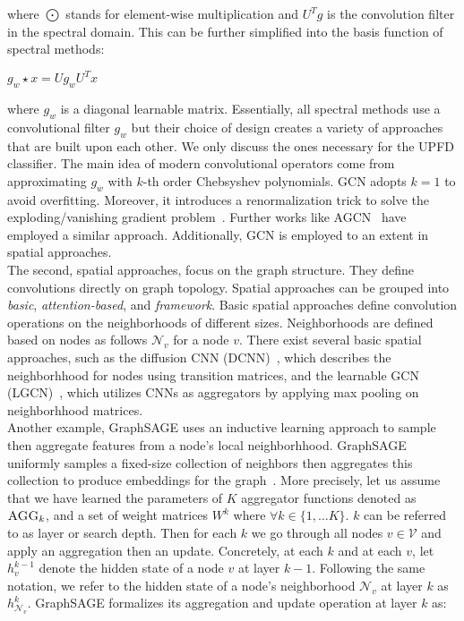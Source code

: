 where $\bigodot$ stands for element-wise multiplication and $U^Tg$ is the convolution filter in the spectral domain. This can be further simplified into the basis function of spectral methods:
\begin{center}
    $g_w \star x = U g_w U^T x$
\end{center}
where $g_w$ is a diagonal learnable matrix. Essentially, all spectral methods use a convolutional filter $g_w$ but their choice of design creates a variety of approaches that are built upon each other. We only discuss the ones necessary for the UPFD classifier. The main idea of modern convolutional operators come from approximating $g_w$ with $k$-th order Chebsyshev polynomials. GCN adopts $k=1$ to avoid overfitting. Moreover, it introduces a renormalization trick to solve the exploding/vanishing gradient problem~\parencite{GCN_Kipf}. Further works like AGCN~\parencite{AGCN_Li} have employed a similar approach. Additionally, GCN is employed to an extent in spatial approaches.\\
The second, spatial approaches, focus on the graph structure. They define convolutions directly on graph topology. Spatial approaches can be grouped into \emph{basic}, \emph{attention-based}, and \emph{framework}. Basic spatial approaches define convolution operations on the neighborhoods of different sizes. Neighborhoods are defined based on nodes as follows $\mathcal{N}_v$ for a node $v$. There exist several basic spatial approaches, such as the diffusion CNN (DCNN)~\parencite{DCNN_Atwood}, which describes the neighborhhood for nodes using transition matrices, and the learnable GCN (LGCN)~\parencite{LGCN_Gao}, which utilizes CNNs as aggregators by applying max pooling on neighborhhood matrices.\\
Another example, GraphSAGE uses an inductive learning approach to sample then aggregate features from a node's local neighborhhood. GraphSAGE uniformly samples a fixed-size collection of neighbors then aggregates this collection to produce embeddings for the graph~\parencite{GraphSAGE_Hamilton}. More precisely, let us assume that we have learned the parameters of $K$ aggregator functions denoted as $\textsc{AGG}_k$, and a set of weight matrices $W^k$ where $\forall k \in \{1, \dots K\}$. $k$ can be referred to as layer or search depth. Then for each $k$ we go through all nodes $v \in \mathcal{V}$ and apply an aggregation then an update. Concretely, at each $k$ and at each $v$, let $h_v^{k-1}$ denote the hidden state of a node $v$ at layer $k-1$. Following the same notation, we refer to the hidden state of a node's neighborhood $\mathcal{N}_v$ at layer $k$ as $h_{\mathcal{N}_v}^k$. GraphSAGE formalizes its aggregation and update operation at layer $k$ as:
